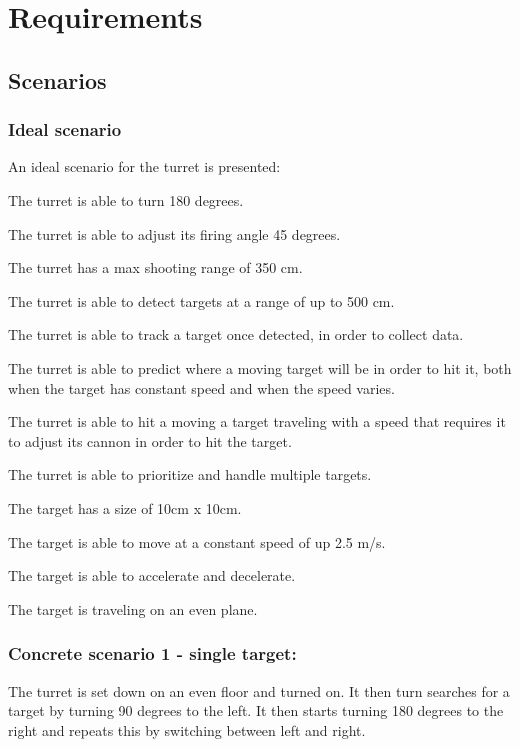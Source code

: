 \chapter{Requirements}
\section{Scenarios}
\subsection{Ideal scenario}
An ideal scenario for the turret is presented:\nl

The turret is able to turn 180 degrees.\nl

The turret is able to adjust its firing angle 45 degrees.\nl
 
The turret has a max shooting range of 350 cm.\nl

The turret is able to detect targets at a range of up to 500 cm.\nl

The turret is able to track a target once detected, in order to collect data.\nl

The turret is able to predict where a moving target will be in order to hit it,
both when the target has constant speed and when the speed varies.\nl

The turret is able to hit a moving a target traveling with a speed that
requires it to adjust its cannon in order to hit the target.\nl

The turret is able to prioritize and handle multiple targets.\nl

The target has a size of 10cm x 10cm.\nl

The target is able to move at a constant speed of up 2.5 m/s.\nl

The target is able to accelerate and decelerate.\nl

The target is traveling on an even plane.\nl



\subsection{Concrete scenario 1 - single target:}
The turret is set down on an even floor and turned on. It then turn searches
for a target by turning 90 degrees to the left. It then starts turning 180
degrees to the right and repeats this by switching between left and right.\nl

